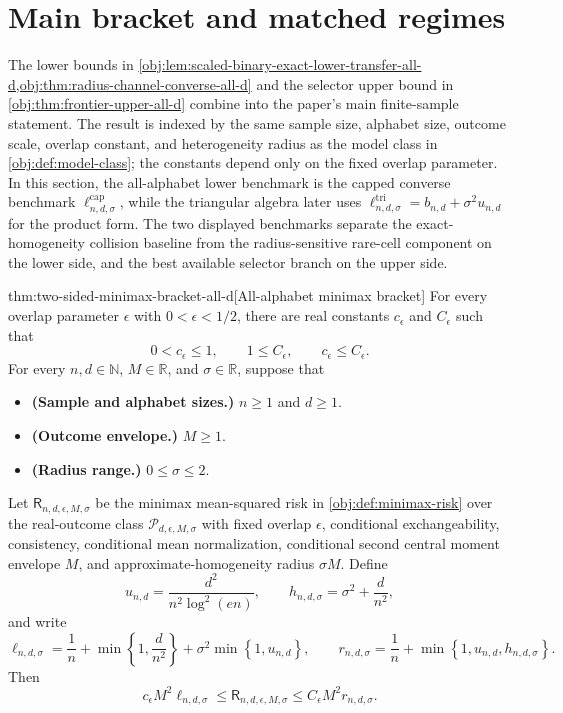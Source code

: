 \section{Main bracket and matched regimes}

The lower bounds in \cref{obj:lem:scaled-binary-exact-lower-transfer-all-d,obj:thm:radius-channel-converse-all-d} and the selector upper bound in \cref{obj:thm:frontier-upper-all-d} combine into the paper's main finite-sample statement. The result is indexed by the same sample size, alphabet size, outcome scale, overlap constant, and heterogeneity radius as the model class in \cref{obj:def:model-class}; the constants depend only on the fixed overlap parameter. In this section, the all-alphabet lower benchmark is the capped converse benchmark \(\ell^{\mathrm{cap}}_{n,d,\sigma}\), while the triangular algebra later uses \(\ell^{\mathrm{tri}}_{n,d,\sigma}=b_{n,d}+\sigma^2u_{n,d}\) for the product form. The two displayed benchmarks separate the exact-homogeneity collision baseline from the radius-sensitive rare-cell component on the lower side, and the best available selector branch on the upper side.

\begin{theoremv}{thm:two-sided-minimax-bracket-all-d}[All-alphabet minimax bracket]
For every overlap parameter \(\epsilon\) with \(0<\epsilon<1/2\), there are real constants \(c_{\epsilon}\) and \(C_{\epsilon}\) such that
\[
0<c_{\epsilon}\le 1,\qquad 1\le C_{\epsilon},\qquad c_{\epsilon}\le C_{\epsilon}.
\]
For every \(n,d\in\mathbb N\), \(M\in\mathbb R\), and \(\sigma\in\mathbb R\), suppose that
\begin{itemize}
\item \textbf{(Sample and alphabet sizes.)} \(n\ge 1\) and \(d\ge 1\).
\item \textbf{(Outcome envelope.)} \(M\ge 1\).
\item \textbf{(Radius range.)} \(0\le \sigma\le 2\).
\end{itemize}
Let \(\mathsf R_{n,d,\epsilon,M,\sigma}\) be the minimax mean-squared risk in \cref{obj:def:minimax-risk} over the real-outcome class \(\mathcal P_{d,\epsilon,M,\sigma}\) with fixed overlap \(\epsilon\), conditional exchangeability, consistency, conditional mean normalization, conditional second central moment envelope \(M\), and approximate-homogeneity radius \(\sigma M\). Define
\[
u_{n,d}=\frac{d^2}{n^2\log^2(en)},
\qquad
h_{n,d,\sigma}=\sigma^2+\frac{d}{n^2},
\]
and write
\[
\ell_{n,d,\sigma}
=
\frac{1}{n}
+
\min\left\{1,\frac{d}{n^2}\right\}
+
\sigma^2\min\left\{1,u_{n,d}\right\},
\qquad
r_{n,d,\sigma}
=
\frac{1}{n}
+
\min\left\{1,u_{n,d},h_{n,d,\sigma}\right\}.
\]
Then
\[
c_{\epsilon}M^2\ell_{n,d,\sigma}
\le
\mathsf R_{n,d,\epsilon,M,\sigma}
\le
C_{\epsilon}M^2r_{n,d,\sigma}.
\]
\end{theoremv}

